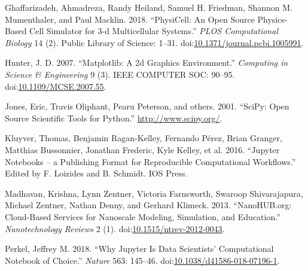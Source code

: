 \documentclass[10pt,letterpaper]{article}
\begin{document}
\hypertarget{refs}{}
\leavevmode\hypertarget{ref-PhysiCell:2018}{}%
Ghaffarizadeh, Ahmadreza, Randy Heiland, Samuel H. Friedman, Shannon M.
Mumenthaler, and Paul Macklin. 2018. ``PhysiCell: An Open Source
Physics-Based Cell Simulator for 3-d Multicellular Systems.'' \emph{PLOS
Computational Biology} 14 (2). Public Library of Science: 1--31.
doi:\href{https://doi.org/10.1371/journal.pcbi.1005991}{10.1371/journal.pcbi.1005991}.

\leavevmode\hypertarget{ref-Hunter:2007}{}%
Hunter, J. D. 2007. ``Matplotlib: A 2d Graphics Environment.''
\emph{Computing in Science \& Engineering} 9 (3). IEEE COMPUTER SOC:
90--95.
doi:\href{https://doi.org/10.1109/MCSE.2007.55}{10.1109/MCSE.2007.55}.

\leavevmode\hypertarget{ref-scipy}{}%
Jones, Eric, Travis Oliphant, Pearu Peterson, and others. 2001. ``SciPy:
Open Source Scientific Tools for Python.'' \url{http://www.scipy.org/}.

\leavevmode\hypertarget{ref-Kluyver:2016aa}{}%
Kluyver, Thomas, Benjamin Ragan-Kelley, Fernando Pérez, Brian Granger,
Matthias Bussonnier, Jonathan Frederic, Kyle Kelley, et al. 2016.
``Jupyter Notebooks -- a Publishing Format for Reproducible
Computational Workflows.'' Edited by F. Loizides and B. Schmidt. IOS
Press.

\leavevmode\hypertarget{ref-nanoHUB_2013}{}%
Madhavan, Krishna, Lynn Zentner, Victoria Farnsworth, Swaroop
Shivarajapura, Michael Zentner, Nathan Denny, and Gerhard Klimeck. 2013.
``NanoHUB.org: Cloud-Based Services for Nanoscale Modeling, Simulation,
and Education.'' \emph{Nanotechnology Reviews} 2 (1).
doi:\href{https://doi.org/10.1515/ntrev-2012-0043}{10.1515/ntrev-2012-0043}.

\leavevmode\hypertarget{ref-Nature_2018_Jupyter}{}%
Perkel, Jeffrey M. 2018. ``Why Jupyter Is Data Scientists' Computational
Notebook of Choice.'' \emph{Nature} 563: 145--46.
doi:\href{https://doi.org/10.1038/d41586-018-07196-1}{10.1038/d41586-018-07196-1}.


\end{document}
